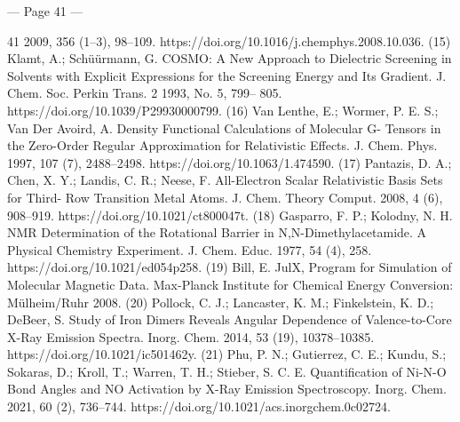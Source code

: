 --- Page 41 ---
 
41 
2009, 356 (1–3), 98–109. https://doi.org/10.1016/j.chemphys.2008.10.036. 
(15)  
Klamt, A.; Schüürmann, G. COSMO: A New Approach to Dielectric Screening in Solvents with Explicit 
Expressions for the Screening Energy and Its Gradient. J. Chem. Soc. Perkin Trans. 2 1993, No. 5, 799–
805. https://doi.org/10.1039/P29930000799. 
(16)  
Van Lenthe, E.; Wormer, P. E. S.; Van Der Avoird, A. Density Functional Calculations of Molecular G-
Tensors in the Zero-Order Regular Approximation for Relativistic Effects. J. Chem. Phys. 1997, 107 (7), 
2488–2498. https://doi.org/10.1063/1.474590. 
(17)  
Pantazis, D. A.; Chen, X. Y.; Landis, C. R.; Neese, F. All-Electron Scalar Relativistic Basis Sets for Third-
Row 
Transition 
Metal 
Atoms. 
J. 
Chem. 
Theory 
Comput. 
2008, 
4 
(6), 
908–919. 
https://doi.org/10.1021/ct800047t. 
(18)  
Gasparro, F. P.; Kolodny, N. H. NMR Determination of the Rotational Barrier in N,N-Dimethylacetamide. 
A Physical Chemistry Experiment. J. Chem. Educ. 1977, 54 (4), 258. https://doi.org/10.1021/ed054p258. 
(19)  
Bill, E. JulX, Program for Simulation of Molecular Magnetic Data. Max-Planck Institute for Chemical 
Energy Conversion: Mülheim/Ruhr 2008. 
(20)  
Pollock, C. J.; Lancaster, K. M.; Finkelstein, K. D.; DeBeer, S. Study of Iron Dimers Reveals Angular 
Dependence of Valence-to-Core X-Ray Emission Spectra. Inorg. Chem. 2014, 53 (19), 10378–10385. 
https://doi.org/10.1021/ic501462y. 
(21)  
Phu, P. N.; Gutierrez, C. E.; Kundu, S.; Sokaras, D.; Kroll, T.; Warren, T. H.; Stieber, S. C. E. Quantification 
of Ni-N-O Bond Angles and NO Activation by X-Ray Emission Spectroscopy. Inorg. Chem. 2021, 60 (2), 
736–744. https://doi.org/10.1021/acs.inorgchem.0c02724.